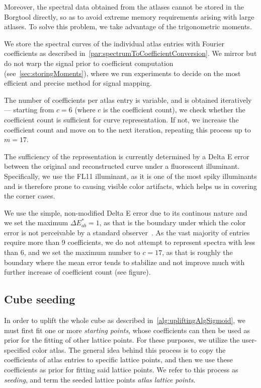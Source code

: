 Moreover, the spectral data obtained from the atlases cannot be stored in the Borgtool directly, so as to avoid extreme memory requirements arising with large atlases. To solve this problem, we take advantage of the trigonometric moments.

We store the spectral curves of the individual atlas entries with Fourier coefficients as described in~\cref{par:spectrumToCoefficientConversion}. We mirror but do not warp the signal prior to coefficient computation (see~\cref{sec:storingMoments}), where we run experiments to decide on the most efficient and precise method for signal mapping.

The number of coefficients per atlas entry is variable, and is obtained iteratively --- starting from $c=6$ (where $c$ is the coefficient count), we check whether the coefficient count is sufficient for curve representation. If not, we increase the coefficient count and move on to the next iteration, repeating this process up to $m=17$.

The sufficiency of the representation is currently determined by a Delta E error between the original and reconstructed curve under a fluorescent illuminant. Specifically, we use the FL11 illuminant, as it is one of the most spiky illuminants and is therefore prone to causing visible color artifacts, which helps us in covering the corner cases.

We use the simple, non-modified Delta E error due to its continous nature and we set the maximum $\Delta E_{ab}^* = 1$, as that is the boundary under which the color error is not perceivable by a standard observer~\cite{maximumDeltaE}. As the vast majority of entries require more than 9 coefficients, we do not attempt to represent spectra with less than 6, and we set the maximum number to $c=17$, as that is roughly the boundary where the mean error tends to stabilize and not improve much with further increase of coefficient count (see figure).

\subsection{Cube seeding} 

In order to uplift the whole cube as described in~\cref{alg:upliftingAlgSigmoid}, we must first fit one or more \emph{starting points}, whose coefficients can then be used as prior for the fitting of other lattice points. For these purposes, we utilize the user-specified color atlas. The general idea behind this process is to copy the coefficients of atlas entries to specific lattice points, and then we use these coefficients as prior for fitting said lattice points. We refer to this process as \emph{seeding}, and term the seeded lattice points \emph{atlas lattice points}.

